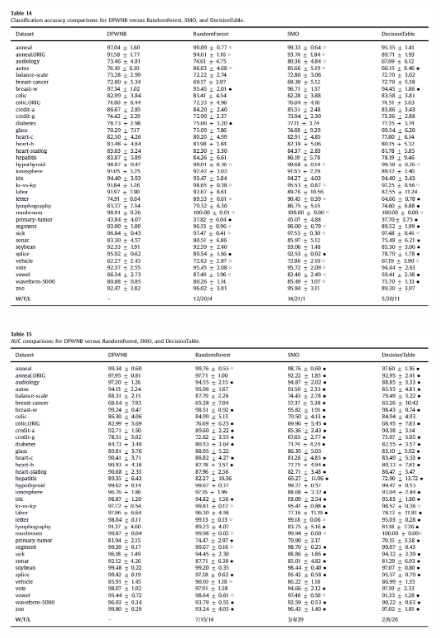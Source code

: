 \documentclass[12pt, a4paper]{article}
\begin{document}
\begin{figure}
    \centering
    \includegraphics[width=\linewidth]{images/article1/table14.png}
    \caption{}
    \label{a1_table14}
\end{figure}
\begin{figure}
    \centering
    \includegraphics[width=\linewidth]{images/article1/table15.png}
    \caption{}
    \label{a1_table15}
\end{figure}

\clearpage
\end{document}

